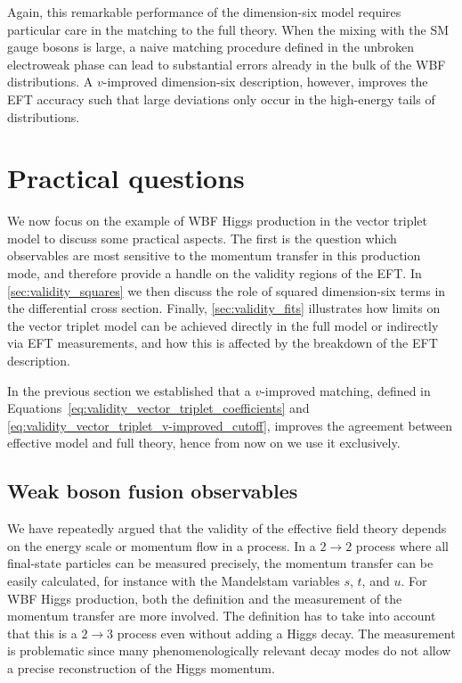 Again, this remarkable performance of the dimension-six model requires
particular care in the matching to the full theory. When the mixing
with the SM gauge bosons is large, a naive matching procedure defined
in the unbroken electroweak phase can lead to substantial errors
already in the bulk of the WBF distributions. A $v$-improved
dimension-six description, however, improves the EFT accuracy such
that large deviations only occur in the high-energy tails of
distributions.




\section{Practical questions}
\label{sec:validity_practical_questions}

We now focus on the example of WBF Higgs production in the vector
triplet model to discuss some practical aspects. The first is the
question which observables are most sensitive to the momentum transfer
in this production mode, and therefore provide a handle on the
validity regions of the EFT. In \autoref{sec:validity_squares} we then
discuss the role of squared dimension-six terms in the differential
cross section. Finally, \autoref{sec:validity_fits} illustrates how
limits on the vector triplet model can be achieved directly in the
full model or indirectly via EFT measurements, and how this is
affected by the breakdown of the EFT description.

In the previous section we established that a $v$-improved matching,
defined in Equations~\eqref{eq:validity_vector_triplet_coefficients}
and \eqref{eq:validity_vector_triplet_v-improved_cutoff}, improves the
agreement between effective model and full theory, hence from now on
we use it exclusively.



\subsection{Weak boson fusion observables}
\label{sec:validity_wbf_observables}

We have repeatedly argued that the validity of the effective field
theory depends on the energy scale or momentum flow in a process. In a
$2 \to 2$ process where all final-state particles can be measured
precisely, the momentum transfer can be easily calculated, for
instance with the Mandelstam variables $s$, $t$, and $u$. For WBF
Higgs production, both the definition and the measurement of the
momentum transfer are more involved. The definition has to take into
account that this is a $2 \to 3$ process even without adding a Higgs
decay. The measurement is problematic since many phenomenologically
relevant decay modes do not allow a precise reconstruction of the
Higgs momentum.

